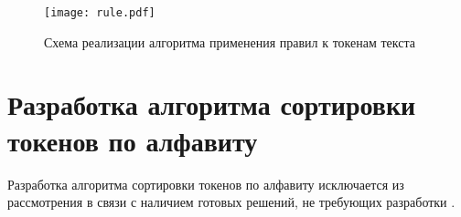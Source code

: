 \begin{figure}[h!]
    \centering
    \texttt{[image: rule.pdf]}
    \caption{Схема реализации алгоритма применения правил к токенам текста}
    \label{img:rule}
\end{figure}

\section{Разработка алгоритма сортировки токенов по алфавиту}
Разработка алгоритма сортировки токенов по алфавиту исключается из рассмотрения в связи с наличием готовых решений, не требующих разработки \cite{web_item14}.

\newpage